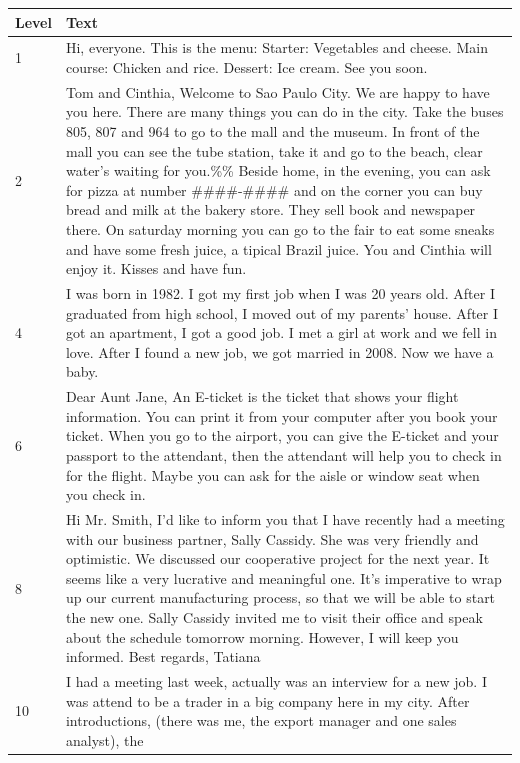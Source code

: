 \documentclass[11pt,a4paper]{article}
\begin{document}
\begin{longtable}{l|p{}}
  \toprule
  Level & Text\\
  \midrule
  1 & Hi, everyone. This is the menu: Starter: Vegetables and cheese. Main
  course: Chicken and rice. Dessert: Ice cream. See you soon.\\
  \midrule
  2 & Tom and Cinthia, Welcome to Sao Paulo City. We are happy to have you
  here. There are many things you can do in the city. Take the buses 805, 807
  and 964 to go to the mall and the museum. In front of the mall you can see
  the tube station, take it and go to the beach, clear water's waiting for
  you.\%\% Beside home, in the evening, you can ask for pizza at number
  \#\#\#\#-\#\#\#\# and on the corner you can buy bread and milk at the bakery store. They sell
  book and newspaper there. On saturday morning you can go to the fair to eat
  some sneaks and have some fresh juice, a tipical Brazil juice. You and
  Cinthia will enjoy it. Kisses and have fun. \\
  \midrule
  4 & I was born in 1982. I got my first job when I was 20 years old. After I
  graduated from high school, I moved out of my parents' house. After I got an
  apartment, I got a good job. I met a girl at work and we fell in love. After
  I found a new job, we got married in 2008. Now we have a baby.\\
  \midrule
  6 & Dear Aunt Jane, An E-ticket is the ticket that shows your flight
  information. You can print it from your computer after you book your ticket.
  When you go to the airport, you can give the E-ticket and your passport to
  the attendant, then the attendant will help you to check in for the flight.
  Maybe you can ask for the aisle or window seat when you check in.\\
  \midrule
  8 & Hi Mr. Smith, I'd like to inform you that I have recently had a meeting
  with our business partner, Sally Cassidy. She was very friendly and
  optimistic. We discussed our cooperative project for the next year. It seems
  like a very lucrative and meaningful one. It's imperative to wrap up our
  current manufacturing process, so that we will be able to start the new one.
  Sally Cassidy invited me to visit their office and speak about the schedule
  tomorrow morning. However, I will keep you informed. Best regards, Tatiana\\
  \midrule
  10 & I had a meeting last week, actually was an interview for a new job. I
  was attend to be a trader in a big company here in my city. After
  introductions, (there was me, the export manager and one sales analyst), the

\end{longtable}
\end{document}
